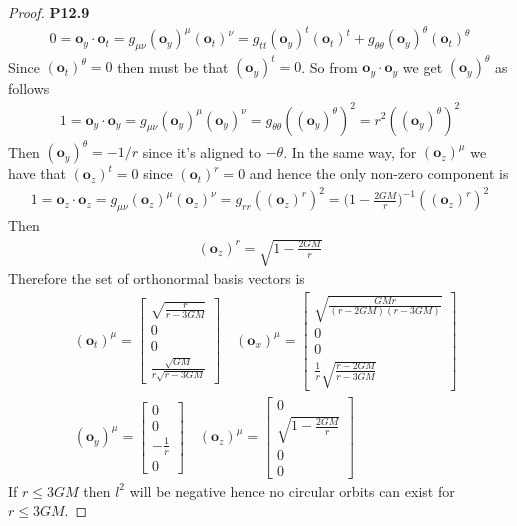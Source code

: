 \documentclass[11pt]{article}
\theoremstyle{definition}
\begin{document}
\begin{proof}{\textbf{P12.9}}
\begin{align*}
        0 = \bm{o}_y \cdot \bm{o}_t
        = g_{\mu\nu} (\bm{o}_y)^\mu (\bm{o}_t)^\nu
        = g_{tt} (\bm{o}_y)^t (\bm{o}_t)^t + g_{\theta\theta} (\bm{o}_y)^\theta (\bm{o}_t)^\theta
    \end{align*}
    Since $(\bm{o}_t)^\theta = 0$ then must be that $(\bm{o}_y)^t = 0$.
    So from $\bm{o}_y\cdot \bm{o}_y$ we get $(\bm{o}_y)^\theta$ as follows
    \begin{align*}
        1 = \bm{o}_y \cdot \bm{o}_y
        = g_{\mu\nu} (\bm{o}_y)^\mu (\bm{o}_y)^\nu
        = g_{\theta\theta} ((\bm{o}_y)^\theta)^2
        = r^2 ((\bm{o}_y)^\theta)^2
    \end{align*}
    Then $(\bm{o}_y)^\theta = -1/r$ since it's aligned to $-\theta$.
    In the same way, for $(\bm{o}_z)^\mu$ we have that $(\bm{o}_z)^t = 0$
    since $(\bm{o}_t)^r = 0$ and hence the only non-zero component is
    \begin{align*}
        1 = \bm{o}_z \cdot \bm{o}_z
        = g_{\mu\nu} (\bm{o}_z)^\mu (\bm{o}_z)^\nu
        = g_{rr} ((\bm{o}_z)^r)^2
        = \bigg(1 - \frac{2GM}{r}\bigg)^{-1}((\bm{o}_z)^r)^2
    \end{align*}
    Then
    \begin{align*}
        (\bm{o}_z)^r = \sqrt{1 - \frac{2GM}{r}}
    \end{align*}
    Therefore the set of orthonormal basis vectors is
    \begin{align*}
        &(\bm{o}_t)^\mu = \begin{bmatrix}
            \sqrt{\frac{r}{r - 3GM}}\\
            0\\ 0 \\
            \frac{\sqrt{GM}}{r\sqrt{r - 3GM}}
        \end{bmatrix}
        \quad (\bm{o}_x)^\mu = \begin{bmatrix}
            \sqrt{\frac{GMr}{(r - 2GM)(r - 3GM)}}\\
            0\\ 0 \\
            \frac{1}{r}\sqrt{\frac{r - 2GM}{r - 3GM}}
        \end{bmatrix}\\
        &(\bm{o}_y)^\mu = \begin{bmatrix}
            0\\ 0\\ -\frac{1}{r} \\ 0
        \end{bmatrix}
        \quad (\bm{o}_z)^\mu = \begin{bmatrix}
            0\\ \sqrt{1 - \frac{2GM}{r}}\\ 0 \\ 0
        \end{bmatrix}
    \end{align*}
    If $r \leq 3GM$ then $l^2$ will be negative hence no circular orbits can
    exist for $r \leq 3GM$.
\end{proof}
\end{document}
